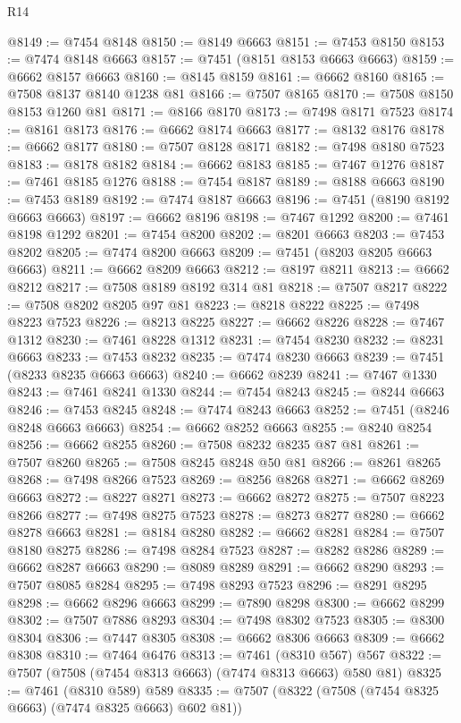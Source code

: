 \begin{lexlean}{R14}
\begin{coremodule}
{{{{{{{{{{{{{{{{{{{{{{{{{{{{{{{{{{{{{{{{{{{{{{{{{{{{{{{{{{{{{{{{{{{{{{{{{{{{{{{{{{@8149 := @7454 @8148
@8150 := @8149 @6663
@8151 := @7453 @8150
@8153 := @7474 @8148 @6663
@8157 := @7451 (@8151 @8153 @6663 @6663)
@8159 := @6662 @8157 @6663
@8160 := @8145 @8159
@8161 := @6662 @8160
@8165 := @7508 @8137 @8140 @1238 @81
@8166 := @7507 @8165
@8170 := @7508 @8150 @8153 @1260 @81
@8171 := @8166 @8170
@8173 := @7498 @8171 @7523
@8174 := @8161 @8173
@8176 := @6662 @8174 @6663
@8177 := @8132 @8176
@8178 := @6662 @8177
@8180 := @7507 @8128 @8171
@8182 := @7498 @8180 @7523
@8183 := @8178 @8182
@8184 := @6662 @8183
@8185 := @7467 @1276
@8187 := @7461 @8185 @1276
@8188 := @7454 @8187
@8189 := @8188 @6663
@8190 := @7453 @8189
@8192 := @7474 @8187 @6663
@8196 := @7451 (@8190 @8192 @6663 @6663)
@8197 := @6662 @8196
@8198 := @7467 @1292
@8200 := @7461 @8198 @1292
@8201 := @7454 @8200
@8202 := @8201 @6663
@8203 := @7453 @8202
@8205 := @7474 @8200 @6663
@8209 := @7451 (@8203 @8205 @6663 @6663)
@8211 := @6662 @8209 @6663
@8212 := @8197 @8211
@8213 := @6662 @8212
@8217 := @7508 @8189 @8192 @314 @81
@8218 := @7507 @8217
@8222 := @7508 @8202 @8205 @97 @81
@8223 := @8218 @8222
@8225 := @7498 @8223 @7523
@8226 := @8213 @8225
@8227 := @6662 @8226
@8228 := @7467 @1312
@8230 := @7461 @8228 @1312
@8231 := @7454 @8230
@8232 := @8231 @6663
@8233 := @7453 @8232
@8235 := @7474 @8230 @6663
@8239 := @7451 (@8233 @8235 @6663 @6663)
@8240 := @6662 @8239
@8241 := @7467 @1330
@8243 := @7461 @8241 @1330
@8244 := @7454 @8243
@8245 := @8244 @6663
@8246 := @7453 @8245
@8248 := @7474 @8243 @6663
@8252 := @7451 (@8246 @8248 @6663 @6663)
@8254 := @6662 @8252 @6663
@8255 := @8240 @8254
@8256 := @6662 @8255
@8260 := @7508 @8232 @8235 @87 @81
@8261 := @7507 @8260
@8265 := @7508 @8245 @8248 @50 @81
@8266 := @8261 @8265
@8268 := @7498 @8266 @7523
@8269 := @8256 @8268
@8271 := @6662 @8269 @6663
@8272 := @8227 @8271
@8273 := @6662 @8272
@8275 := @7507 @8223 @8266
@8277 := @7498 @8275 @7523
@8278 := @8273 @8277
@8280 := @6662 @8278 @6663
@8281 := @8184 @8280
@8282 := @6662 @8281
@8284 := @7507 @8180 @8275
@8286 := @7498 @8284 @7523
@8287 := @8282 @8286
@8289 := @6662 @8287 @6663
@8290 := @8089 @8289
@8291 := @6662 @8290
@8293 := @7507 @8085 @8284
@8295 := @7498 @8293 @7523
@8296 := @8291 @8295
@8298 := @6662 @8296 @6663
@8299 := @7890 @8298
@8300 := @6662 @8299
@8302 := @7507 @7886 @8293
@8304 := @7498 @8302 @7523
@8305 := @8300 @8304
@8306 := @7447 @8305
@8308 := @6662 @8306 @6663
@8309 := @6662 @8308
@8310 := @7464 @6476
@8313 := @7461 (@8310 @567) @567
@8322 := @7507 (@7508 (@7454 @8313 @6663) (@7474 @8313 @6663) @580 @81)
@8325 := @7461 (@8310 @589) @589
@8335 := @7507 (@8322 (@7508 (@7454 @8325 @6663) (@7474 @8325 @6663) @602 @81))
}}}}}}}}}}}}}}}}}}}}}}}}}}}}}}}}}}}}}}}}}}}}}}}}}}}}}}}}}}}}}}}}}}}}}}}}}}}}}}}}}}
\end{coremodule}
\end{lexlean}
